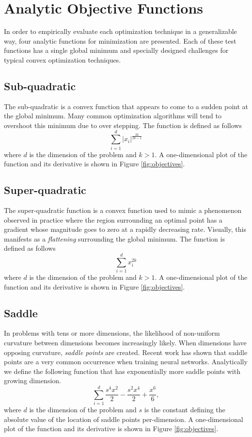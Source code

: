 \documentclass[conference]{ieeeconf}  %
\begin{document}
\section{Analytic Objective Functions}

In order to empirically evaluate each optimization technique in a
generalizable way, four analytic functions for minimization are
presented.  Each of these test functions has a single global minimum
and specially designed challenges for typical convex optimization
techniques.

\subsection{Sub-quadratic}

The sub-quadratic is a convex function that appears to come to a
sudden point at the global minimum.  Many common optimization
algorithms will tend to overshoot this minimum due to over stepping.
The function is defined as follows
$$ \sum_{i=1}^{d} |x_i|^{\frac{2k}{2k-1}} $$
where $d$ is the dimension of the problem and $k > 1$.  A
one-dimensional plot of the function and its derivative is shown in
Figure \ref{fig:objectives}.

\subsection{Super-quadratic}

The super-quadratic function is a convex function used to mimic a
phenomenon observed in practice where the region surrounding an
optimal point has a gradient whose magnitude goes to zero at a rapidly
decreasing rate.  Visually, this manifests as a \textit{flattening}
surrounding the global minimum.  The function is defined as follows
$$ \sum_{i=1}^{d} x_i^{2k} $$
where $d$ is the dimension of the problem and $k > 1$.  A
one-dimensional plot of the function and its derivative is shown in
Figure \ref{fig:objectives}.

\subsection{Saddle}

In problems with tens or more dimensions, the likelihood of
non-uniform curvature between dimensions becomes increasingly likely.
When dimensions have opposing curvature, {\it saddle points} are
created.  Recent work \cite{dauphin2014identifying} has shown that
saddle points are a very common occurrence when training neural
networks.  Analytically we define the following function that has
exponentially more saddle points with growing dimension.
$$ \sum_{i=1}^{d} \frac{s^4 x^2}{2} - \frac{s^2 x^4}{2} + \frac{x^6}{6}, $$
where $d$ is the dimension of the problem and $s$ is the constant
defining the absolute value of the location of saddle points
per-dimension.  A one-dimensional plot of the function and its
derivative is shown in Figure \ref{fig:objectives}.
\end{document}
